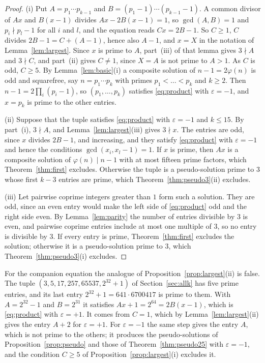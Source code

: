 \documentclass[11pt,reqno]{amsart}
\numberwithin{equation}{section}
\theoremstyle{plain}
\theoremstyle{definition}
\theoremstyle{remark}
\begin{document}
\begin{proof}
(i) Put $A=p_1\cdots p_{k-1}$ and $B=(p_1-1)\cdots(p_{k-1}-1)$. A
common divisor of $Ax$ and $B(x-1)$ divides $Ax-2B(x-1)=1$, so
$\gcd(A,B)=1$ and $p_i\nmid p_l-1$ for all $i$ and $l$, and the
equation reads $Cx=2B-1$. So $C\ge1$, $C$ divides $2B-1=C+(A-1)$, hence
also $A-1$, and $x=X$ in the notation of Lemma~\ref{lem:largest}. Since
$x$ is prime to $A$, part~(iii) of that lemma gives $3\nmid A$ and
$3\nmid C$, and part~(ii) gives $C\ne1$, since $X=A$ is not prime to
$A>1$. As $C$ is odd, $C\ge5$. By Lemma~\ref{lem:basic}(i) a composite
solution of $n-1=2\varphi(n)$ is odd and squarefree, say
$n=p_1\cdots p_k$ with primes $p_1<\dots<p_k$ and $k\ge2$. Then
$n-1=2\prod_i(p_i-1)$, so $(p_1,\dots,p_k)$ satisfies
\eqref{eq:product} with $\varepsilon=-1$, and $x=p_k$ is prime to the
other entries.

(ii) Suppose that the tuple satisfies \eqref{eq:product} with
$\varepsilon=-1$ and $k\le15$. By part~(i), $3\nmid A$, and
Lemma~\ref{lem:largest}(iii) gives $3\nmid x$.
The entries are odd, since $x$ divides $2B-1$, and increasing, and
they satisfy \eqref{eq:product} with $\varepsilon=-1$ and hence the
conditions $\gcd(x_i,x_l-1)=1$. If $x$ is prime,
then $Ax$ is a composite solution of $\varphi(n)\mid n-1$ with at most
fifteen prime factors, which Theorem~\ref{thm:first} excludes.
Otherwise the tuple is a pseudo-solution prime to $3$ whose first $k-3$
entries are prime, which Theorem~\ref{thm:pseudo3}(ii) excludes.

(iii) Let pairwise coprime integers greater than $1$ form such a
solution. They are odd, since an
even entry would make the left side of \eqref{eq:product} odd and the
right side even. By Lemma~\ref{lem:parity} the number of entries
divisible by $3$ is even, and pairwise coprime entries include at most
one multiple of $3$, so no entry is divisible by $3$. If every entry is
prime, Theorem~\ref{thm:first} excludes the solution; otherwise it is a
pseudo-solution prime to $3$, which Theorem~\ref{thm:pseudo3}(i)
excludes.
\end{proof}

For the companion equation the analogue of
Proposition~\ref{prop:largest}(ii) is false. The tuple
$(3,5,17,257,\allowbreak65537,2^{32}+1)$ of Section~\ref{sec:allk} has five prime
entries, and its last entry $2^{32}+1=641\cdot6700417$ is prime to
them. With $A=2^{32}-1$ and $B=2^{31}$ it satisfies
$Ax+1=2^{64}=2B(x-1)$, which is \eqref{eq:product} with
$\varepsilon=+1$. It comes from $C=1$, which by
Lemma~\ref{lem:largest}(ii) gives the entry $A+2$ for $\varepsilon=+1$.
For $\varepsilon=-1$ the same step gives the entry $A$, which is not
prime to the others; it produces the pseudo-solutions of
Proposition~\ref{prop:pseudo} and those of Theorem~\ref{thm:pseudo25}
with $\varepsilon=-1$, and the condition $C\ge5$ of
Proposition~\ref{prop:largest}(i) excludes it.
\end{document}
